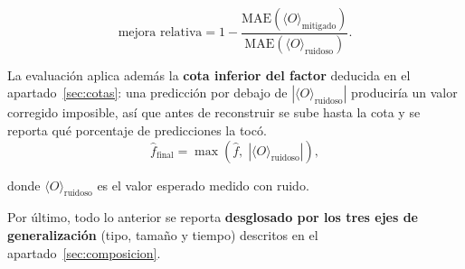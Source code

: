 \begin{equation}
\label{eq:mejora_relativa}
\text{mejora relativa} = 1 - \frac{\text{MAE}(\langle O\rangle_{\text{mitigado}})}
                                  {\text{MAE}(\langle O\rangle_{\text{ruidoso}})} .
\end{equation}

\label{sec:cota}%
La evaluación aplica además la \textbf{cota inferior del factor} deducida en el
apartado~\ref{sec:cotas}: una predicción por debajo de $|\langle O\rangle_{\text{ruidoso}}|$ produciría un valor corregido
imposible, así que antes de reconstruir se sube hasta la cota y se reporta qué porcentaje de
predicciones la tocó.
\begin{equation}
\label{eq:cota}
\hat f_{\text{final}} = \max\left(\hat f,\; |\langle O\rangle_{\text{ruidoso}}|\right),
\end{equation}

\noindent donde $\langle O\rangle_{\text{ruidoso}}$ es el valor esperado medido con ruido.

\label{sec:reportar}%
Por último, todo lo anterior se reporta \textbf{desglosado por los tres ejes de
generalización} (tipo, tamaño y tiempo) descritos en el apartado~\ref{sec:composicion}. 
